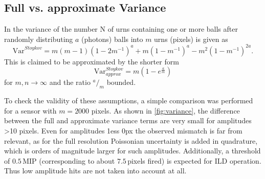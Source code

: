 \documentclass[12pt]{article} %
\begin{document}
\begin{appendices}
\section{Full vs. approximate Variance \cite{PPD}}
\label{sec:variance_para}
In \cite{PPD} the variance of the number N of urns containing one or more balls after randomly distributing $a$ (photons) balls into $m$ urns (pixels) is given as
\begin{equation}
	\mathrm{Var}^{Stoykov} = m(m-1)(1-2m^{-1})^a+m(1-m^{-1})^a-m^2(1-m^{-1})^{2a}.
\end{equation}
This is claimed to be approximated by the shorter form
\begin{equation}
	\mathrm{Var}^{Stoykov}_{approx} = m(1-e^{\frac{a}{m}})
\end{equation}
for $m, n \rightarrow \infty$ and the ratio ${}^a/_m$ bounded. 

To check the validity of these assumptions, a simple comparison was performed for a sensor with $m=2000$ pixels. As shown in \autoref{fig:variance}, the difference between the full and approximate variance terms are very small for amplitudes \textgreater 10 pixels. Even for amplitudes \text1ess 0px the observed mismatch is far from relevant, as for the full resolution Poissonian uncertainty is added in quadrature, which is orders of magnitude larger for such amplitudes. Additionally, a threshold of $0.5$\,MIP (corresponding to about $7.5$\,pixels fired) is expected for ILD operation. Thus low amplitude hits are not taken into account at all.


\end{appendices}
\end{document}
